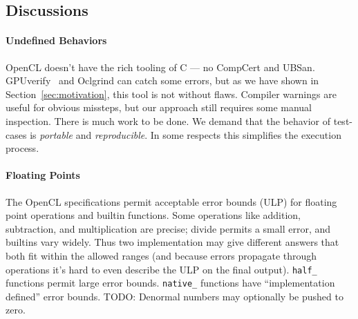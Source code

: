 %


\subsection{Discussions}\label{subsec:discussions}

\paragraph{Undefined Behaviors} OpenCL doesn't have the rich tooling of C --- no CompCert and UBSan. GPUverify~\cite{Betts2012} and Oclgrind can catch some errors, but as we have shown in Section~\ref{sec:motivation}, this tool is not without flaws. Compiler warnings are useful for obvious missteps, but our approach still requires some manual inspection. There is much work to be done. We demand that the behavior of test-cases is \emph{portable} and \emph{reproducible}. In some respects this simplifies the execution process.

\paragraph{Floating Points} The OpenCL specifications permit acceptable error bounds (ULP) for floating point operations and builtin functions. Some operations like addition, subtraction, and multiplication are precise; divide permits a small error, and builtins vary widely. Thus two implementation may give different answers that both fit within the allowed ranges (and because errors propagate through operations it's hard to even describe the ULP on the final output). \texttt{half\_} functions permit large error bounds. \texttt{native\_} functions have ``implementation defined'' error bounds. TODO: Denormal numbers may optionally be pushed to zero.

